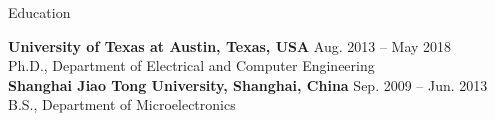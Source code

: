 

\begin{rSection}{Education}


{\bf University of Texas at Austin, Texas, USA} \hfill {Aug. 2013 -- May 2018} \\ 
Ph.D., Department of Electrical and Computer Engineering \\

{\bf Shanghai Jiao Tong University, Shanghai, China} \hfill {Sep. 2009 -- Jun. 2013} \\ 
B.S., Department of Microelectronics \\

\end{rSection}

